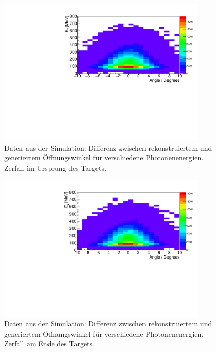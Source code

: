 \documentclass[a4paper,11pt,oneside,final,german,openbib,pdftex]{scrbook}
\begin{document}
{\begin{appendix}
\begin{figure}[h!]
	\begin{center}
		\includegraphics[width=100mm]{OeffZVertex/20170205DiffOeffZVertexUrsprung}
		\caption[Simulation: Differenz zwischen rek. und gen. \"Offnungswinkel: Zerfall im Ursprung des Targets]{Daten aus der Simulation: Differenz zwischen rekonstruiertem und generiertem \"Offnungswinkel f\"ur verschiedene Photonenenergien. Zerfall im Ursprung des Targets.}
		\label{fig:OeffZVertex0}
		
	\end{center}
\end{figure}

\begin{figure}[h!]
	\begin{center}
		\includegraphics[width=100mm]{OeffZVertex/20170205DiffOeffZVertex+4}
		\caption[Simulation: Differenz zwischen rek. und gen. \"Offnungswinkel: Zerfall am Ende des Targets]{Daten aus der Simulation: Differenz zwischen rekonstruiertem und generiertem \"Offnungswinkel f\"ur verschiedene Photonenenergien. Zerfall am Ende des Targets.}
		\label{fig:OeffZVertex4}
		
	\end{center}
\end{figure}


\end{appendix}}
\end{document}

